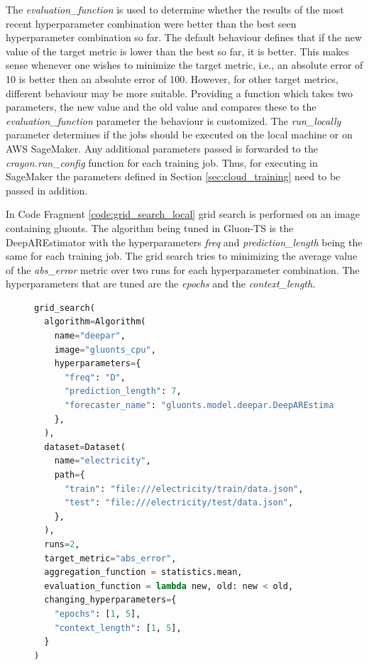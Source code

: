 The \textit{evaluation\_function} is used to determine whether the results of the most recent hyperparameter combination were better than the best seen hyperparameter combination so far. The default behaviour defines that if the new value of the target metric is lower than the best so far, it is better. This makes sense whenever one wishes to minimize the target metric, i.e., an absolute error of 10 is better then an absolute error of 100. However, for other target metrics, different behaviour may be more suitable. Providing a function which takes two parameters, the new value and the old value and compares these to the \textit{evaluation\_function} parameter the behaviour is customized. The \textit{run\_locally} parameter determines if the jobs should be executed on the local machine or on AWS SageMaker. Any additional parameters passed is forwarded to the \textit{crayon.run\_config} function for each training job. Thus, for executing in SageMaker the parameters defined in Section \ref{sec:cloud_training} need to be passed in addition.

In Code Fragment \ref{code:grid_search_local} grid search is performed on an image containing gluonts. The algorithm being tuned in Gluon-TS is the DeepAREstimator with the hyperparameters \textit{freq} and \textit{prediction\_length} being the same for each training job. The grid search tries to minimizing the average value of the \textit{abs\_error} metric over two runs for each hyperparameter combination. The hyperparameters that are tuned are the \textit{epochs} and the \textit{context\_length}.
\begin{figure}
  \begin{lstlisting}[language=Python, label={code:grid_search_local}, caption={Grid search running locally.}]
grid_search(
  algorithm=Algorithm(
    name="deepar",
    image="gluonts_cpu",
    hyperparameters={
      "freq": "D",
      "prediction_length": 7,
      "forecaster_name": "gluonts.model.deepar.DeepAREstimator",
    },
  ),
  dataset=Dataset(
    name="electricity",
    path={
      "train": "file:///electricity/train/data.json",
      "test": "file:///electricity/test/data.json",
    },
  ),
  runs=2,
  target_metric="abs_error",
  aggregation_function = statistics.mean, 
  evaluation_function = lambda new, old: new < old,
  changing_hyperparameters={
    "epochs": [1, 5],
    "context_length": [1, 5],
  }
)
  \end{lstlisting}
\end{figure}


